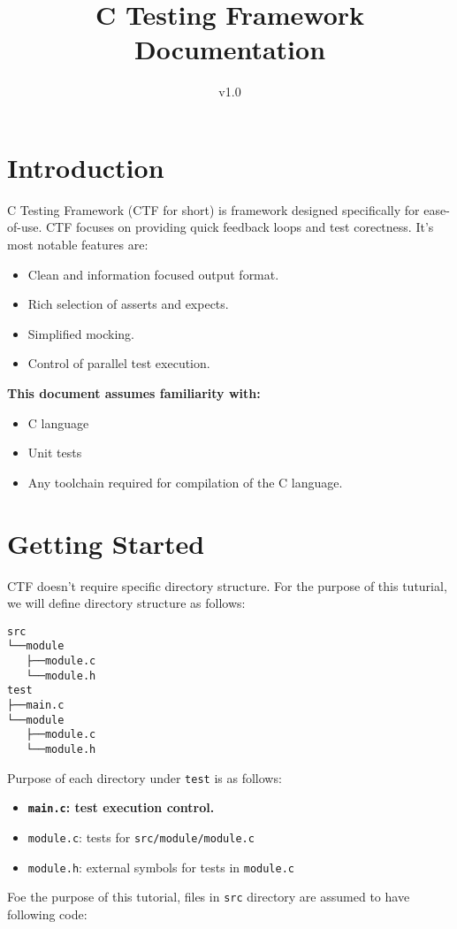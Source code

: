 \documentclass[12pt]{article}
\title{C Testing Framework Documentation}
\author{v1.0}
\date{ }
\begin{document}
\maketitle
\tableofcontents
\section{Introduction}
C Testing Framework (CTF for short) is framework designed specifically
for ease-of-use. CTF focuses on providing quick feedback loops and test corectness.
It's most notable features are:
\begin{itemize}
  \item Clean and information focused output format.
  \item Rich selection of asserts and expects.
  \item Simplified mocking.
  \item Control of parallel test execution.
\end{itemize}
\textbf{This document assumes familiarity with:}
\begin{itemize}
  \item C language
  \item Unit tests
  \item Any toolchain required for compilation of the C language.
\end{itemize}
\section{Getting Started}
CTF doesn't require specific directory structure. For the purpose of this tuturial, we
will define directory structure as follows:
\begin{verbatim}
src
└──module
   ├──module.c
   └──module.h
test
├──main.c
└──module
   ├──module.c
   └──module.h
\end{verbatim}
Purpose of each directory under \texttt{test} is as follows:
\begin{itemize}
  \item \textbf{\texttt{main.c}: test execution control.}
  \item \texttt{module.c}: tests for \texttt{src/module/module.c}
  \item \texttt{module.h}: external symbols for tests in \texttt{module.c}
\end{itemize}
Foe the purpose of this tutorial, files in \texttt{src} directory are assumed
to have following code:
\end{document}
